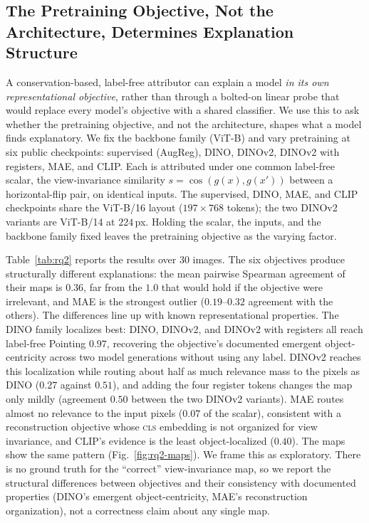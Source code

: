 \documentclass[lettersize,journal]{IEEEtran}
\theoremstyle{definition}
\theoremstyle{plain}
\begin{document}
\subsection{The Pretraining Objective, Not the Architecture, Determines Explanation Structure}
\label{sec:rq2}
A conservation-based, label-free attributor can explain a model \emph{in its own representational objective}, rather than through a bolted-on linear probe that would replace every model's objective with a shared classifier. We use this to ask whether the pretraining objective, and not the architecture, shapes what a model finds explanatory. We fix the backbone family (ViT-B) and vary pretraining at six public checkpoints: supervised (AugReg), DINO, DINOv2, DINOv2 with registers, MAE, and CLIP. Each is attributed under one common label-free scalar, the view-invariance similarity $s=\cos(g(x),g(x'))$ between a horizontal-flip pair, on identical inputs. The supervised, DINO, MAE, and CLIP checkpoints share the ViT-B/16 layout ($197{\times}768$ tokens); the two DINOv2 variants are ViT-B/14 at $224$\,px. Holding the scalar, the inputs, and the backbone family fixed leaves the pretraining objective as the varying factor.

Table~\ref{tab:rq2} reports the results over 30 images. The six objectives produce structurally different explanations: the mean pairwise Spearman agreement of their maps is $0.36$, far from the $1.0$ that would hold if the objective were irrelevant, and MAE is the strongest outlier ($0.19$--$0.32$ agreement with the others). The differences line up with known representational properties. The DINO family localizes best: DINO, DINOv2, and DINOv2 with registers all reach label-free Pointing $0.97$, recovering the objective's documented emergent object-centricity across two model generations without using any label. DINOv2 reaches this localization while routing about half as much relevance mass to the pixels as DINO ($0.27$ against $0.51$), and adding the four register tokens changes the map only mildly (agreement $0.50$ between the two DINOv2 variants). MAE routes almost no relevance to the input pixels ($0.07$ of the scalar), consistent with a reconstruction objective whose \textsc{cls} embedding is not organized for view invariance, and CLIP's evidence is the least object-localized ($0.40$). The maps show the same pattern (Fig.~\ref{fig:rq2-maps}). We frame this as exploratory. There is no ground truth for the ``correct'' view-invariance map, so we report the structural differences between objectives and their consistency with documented properties (DINO's emergent object-centricity, MAE's reconstruction organization), not a correctness claim about any single map.
\end{document}

